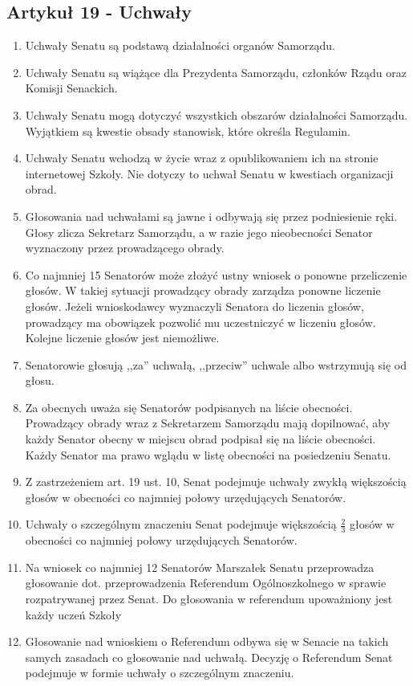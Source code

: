 \documentclass[14pt]{article}
\newenvironment{ustepy}{%
	\begin{enumerate}[leftmargin=1.5em, itemindent=1pt, labelwidth=1em, itemsep=5pt]
	}{%
	\end{enumerate}
}
\begin{document}
\subsection*{Artykuł 19 - Uchwały}
\begin{ustepy}
	\item Uchwały Senatu są podstawą działalności organów Samorządu.
	\item Uchwały Senatu są wiążące dla Prezydenta Samorządu, członków Rządu oraz Komisji Senackich.
	\item Uchwały Senatu mogą dotyczyć wszystkich obszarów działalności Samorządu. Wyjątkiem są kwestie obsady stanowisk, które określa Regulamin.
	\item Uchwały Senatu wchodzą w życie wraz z opublikowaniem ich na stronie internetowej Szkoły. Nie dotyczy to uchwał Senatu w kwestiach organizacji obrad.
	\item Głosowania nad uchwałami są jawne i odbywają się przez podniesienie ręki. Głosy zlicza Sekretarz Samorządu, a w razie jego nieobecności Senator wyznaczony przez prowadzącego obrady.
	\item Co najmniej 15 Senatorów może złożyć ustny wniosek o ponowne przeliczenie głosów. W takiej sytuacji prowadzący obrady zarządza ponowne liczenie głosów. Jeżeli wnioskodawcy wyznaczyli Senatora do liczenia głosów, prowadzący ma obowiązek pozwolić mu uczestniczyć w liczeniu głosów. Kolejne liczenie głosów jest niemożliwe. 
	\item Senatorowie głosują ,,za'' uchwałą, ,,przeciw'' uchwale albo wstrzymują się od głosu. 
	\item Za obecnych uważa się Senatorów podpisanych na liście obecności. Prowadzący obrady wraz z Sekretarzem Samorządu mają dopilnować, aby każdy Senator obecny w miejscu obrad podpisał się na liście obecności. Każdy Senator ma prawo wglądu w listę obecności na posiedzeniu Senatu.
	\item Z zastrzeżeniem art. 19 ust. 10, Senat podejmuje uchwały zwykłą większością głosów w obecności co najmniej połowy urzędujących Senatorów.
	\item Uchwały o szczególnym znaczeniu Senat podejmuje większością \(\frac{2}{3}\) głosów w obecności co najmniej połowy urzędujących Senatorów. 
	\item Na wniosek co najmniej 12 Senatorów Marszałek Senatu przeprowadza głosowanie dot. przeprowadzenia Referendum Ogólnoszkolnego w sprawie rozpatrywanej przez Senat. Do głosowania w referendum upoważniony jest każdy uczeń Szkoły
	\item Głosowanie nad wnioskiem o Referendum odbywa się w Senacie na takich samych zasadach co głosowanie nad uchwałą. Decyzję o Referendum Senat podejmuje w formie uchwały o szczególnym znaczeniu.

\end{ustepy}
\end{document}
